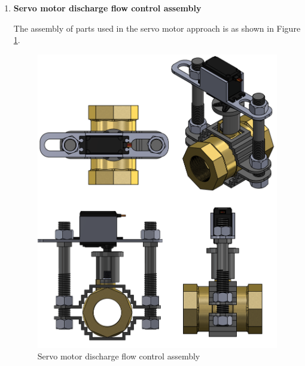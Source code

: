 \begin{enumerate}
\begin{enumerate}
    \par
    \item \textbf{Servo motor discharge flow control assembly}
    \par
    The assembly of parts used in the servo motor approach is as shown in Figure \ref{fig:servo_motor_discharge flow control assembly}.
     \begin{figure}[H]
         \centering
         \includegraphics[height=.55\textheight]{Figures/FlowControlSubUnitAssembly.PNG}
         \caption{Servo motor discharge flow control assembly}
         \label{fig:servo_motor_discharge flow control assembly}
     \end{figure}
      
    \end{enumerate}
\end{enumerate}

